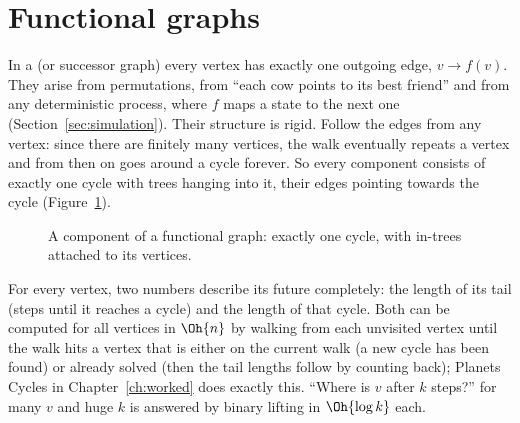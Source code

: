 
\section[Functional graphs]{Functional graphs \hfill \gold}\label{sec:functional}

In a  (or successor graph) every vertex has exactly one outgoing edge, $v \to f(v)$. They arise from
permutations, from ``each cow points to its best friend'' and from any deterministic process, where $f$ maps a state to the
next one (Section~\ref{sec:simulation}). Their structure is rigid. Follow the edges from any vertex: since there are finitely
many vertices, the walk eventually repeats a vertex and from then on goes around a cycle forever. So every component consists
of exactly one cycle with trees hanging into it, their edges pointing towards the cycle (Figure~\ref{fig:functional}).

\begin{figure}[htbp]
\centering
{}
\caption{A component of a functional graph: exactly one cycle, with in-trees attached to its vertices.}
\label{fig:functional}
\end{figure}

For every vertex, two numbers describe its future completely: the length of its tail (steps until it reaches a cycle) and the
length of that cycle. Both can be computed for all vertices in $\Oh{n}$ by walking from each unvisited vertex until the walk
hits a vertex that is either on the current walk (a new cycle has been found) or already solved (then the tail lengths follow
by counting back); Planets Cycles in Chapter~\ref{ch:worked} does exactly this. ``Where is $v$ after $k$ steps?'' for many
$v$ and huge $k$ is answered by binary lifting in $\Oh{\log k}$ each.


